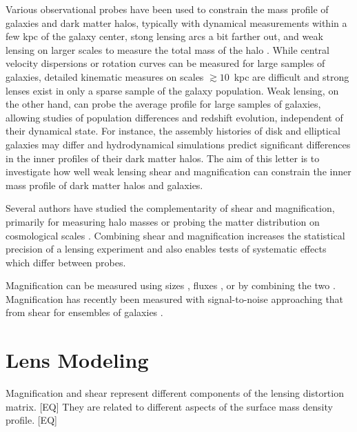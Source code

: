 \documentclass[12pt]{emulateapj}
\begin{document}
Various observational probes have been used to constrain the mass
profile of galaxies and dark matter halos, typically with dynamical
measurements within a few kpc of the galaxy center, stong lensing arcs
a bit farther out, and weak lensing on larger scales to measure the
total mass of the halo \citep[e.g.,][]{Sand2004, Koopmans2006,
  Gavazzi2007, Jiang2007, Auger2010, Schulz2010, Newman2013a}.  While
central velocity dispersions or rotation curves can be measured for
large samples of galaxies, detailed kinematic measures on scales
$\gtrsim10$~kpc are difficult and strong lenses exist in only a sparse
sample of the galaxy population. Weak lensing, on the other hand, can
probe the average profile for large samples of galaxies, allowing
studies of population differences and redshift evolution, independent
of their dynamical state. For instance, the assembly histories of disk
and elliptical galaxies may differ and hydrodynamical simulations
predict significant differences in the inner profiles of their dark
matter halos.  The aim of this letter is to investigate how well weak
lensing shear and magnification can constrain the inner mass profile
of dark matter halos and galaxies.

Several authors have studied the complementarity of shear and
magnification, primarily for measuring halo masses
\citep{Bartelmann1996, Bridle1998, Schneider2000, vanWaerbeke2010b,
  Rozo2010, Umetsu2011} or probing the matter distribution on
cosmological scales \citep{vanWaerbeke2010a, Casaponsa2013,
  Duncan2013, Krause2013}. Combining shear and magnification increases
the statistical precision of a lensing experiment and also enables
tests of systematic effects which differ between probes.

Magnification can be measured using sizes \citep{Bartelmann1995},
fluxes \citep{Broadhurst1995}, or by combining the two
\citep{Huff2011, Schmidt2012}. Magnification has recently been
measured with signal-to-noise approaching that from shear for
ensembles of galaxies \citep{Scranton2005, Hildebrandt2009,
  Menard2010, Huff2011, Ford2012, Schmidt2012}.

\section{Lens Modeling}

Magnification and shear represent different components of the
lensing distortion matrix. [EQ] They are related to different aspects of
the surface mass density profile. [EQ]
\end{document}
